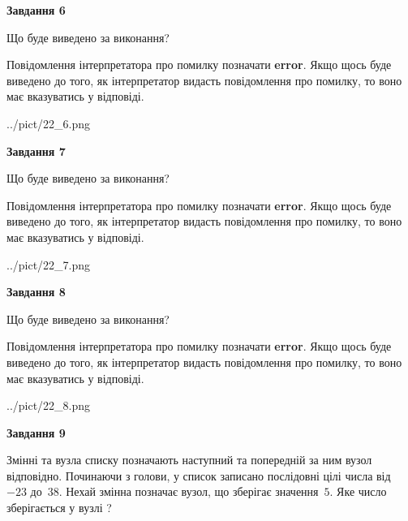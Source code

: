 \documentclass[12pt, ukrainian]{article}
\begin{document}
{\begin {large}
{\begin {center}\textbf{Завдання 6}\end {center}}\par
Що буде виведено за виконання?

Повідомлення інтерпретатора про помилку позначати \textbf{error}.
Якщо щось буде виведено до того, як інтерпретатор видасть повідомлення про помилку, 
то воно має вказуватись у відповіді. \par


\begin{center}
	{../pict/22_6.png}
\end{center}
\newpage

{\begin {center}\textbf{Завдання 7}\end {center}}\par
Що буде виведено за виконання?

Повідомлення інтерпретатора про помилку позначати \textbf{error}.
Якщо щось буде виведено до того, як інтерпретатор видасть повідомлення про помилку, 
то воно має вказуватись у відповіді. \par


\begin{center}
	{../pict/22_7.png}
\end{center}
\newpage

{\begin {center}\textbf{Завдання 8}\end {center}}\par
Що буде виведено за виконання?

Повідомлення інтерпретатора про помилку позначати \textbf{error}.
Якщо щось буде виведено до того, як інтерпретатор видасть повідомлення про помилку, 
то воно має вказуватись у відповіді. \par


\begin{center}
	{../pict/22_8.png}
\end{center}
\newpage

{\begin {center}\textbf{Завдання 9}\end {center}}\par
Змінні  та  вузла списку позначають наступний та попередній за ним вузол відповідно. Починаючи з голови, у список записано послідовні цілі числа від~$-23$ до~$38$. Нехай змінна  позначає вузол, що зберігає значення~$5$.
Яке число зберігається у вузлі  ?\par
\newpage


\end{large}}
\end{document}
